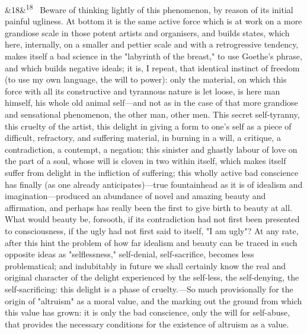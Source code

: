 \documentclass[12pt]{article}
\newcommand{\para}[1][]{\par\noindent\ifx&#1&\else\textsuperscript{\footnotesize #1}~\fi}
\begin{document}
\para[18] Beware of thinking lightly of this phenomenon, by reason of its initial painful ugliness. At bottom it is the same active force which is at work on a more grandiose scale in those potent artists and organisers, and builds states, which here, internally, on a smaller and pettier scale and with a retrogressive tendency, makes itself a bad science in the "labyrinth of the breast," to use Goethe's phrase, and which builds negative ideals; it is, I repeat, that identical instinct of freedom (to use my own language, the will to power): only the material, on which this force with all its constructive and tyrannous nature is let loose, is here man himself, his whole old animal self---and not as in the case of that more grandiose and sensational phenomenon, the other man, other men. This secret self-tyranny, this cruelty of the artist, this delight in giving a form to one's self as a piece of difficult, refractory, and suffering material, in burning in a will, a critique, a contradiction, a contempt, a negation; this sinister and ghastly labour of love on the part of a soul, whose will is cloven in two within itself, which makes itself suffer from delight in the infliction of suffering; this wholly active bad conscience has finally (as one already anticipates)---true fountainhead as it is of idealism and imagination---produced an abundance of novel and amazing beauty and affirmation, and perhaps has really been the first to give birth to beauty at all. What would beauty be, forsooth, if its contradiction had not first been presented to consciousness, if the ugly had not first said to itself, "I am ugly"? At any rate, after this hint the problem of how far idealism and beauty can be traced in such opposite ideas as "selflessness," self-denial, self-sacrifice, becomes less problematical; and indubitably in future we shall certainly know the real and original character of the delight experienced by the self-less, the self-denying, the self-sacrificing: this delight is a phase of cruelty.---So much provisionally for the origin of "altruism" as a moral value, and the marking out the ground from which this value has grown: it is only the bad conscience, only the will for self-abuse, that provides the necessary conditions for the existence of altruism as a value.
\end{document}
